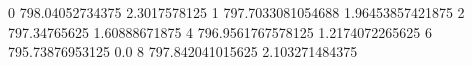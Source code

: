 0 798.04052734375 2.3017578125
1 797.7033081054688 1.96453857421875
2 797.34765625 1.60888671875
4 796.9561767578125 1.2174072265625
6 795.73876953125 0.0
8 797.842041015625 2.103271484375
